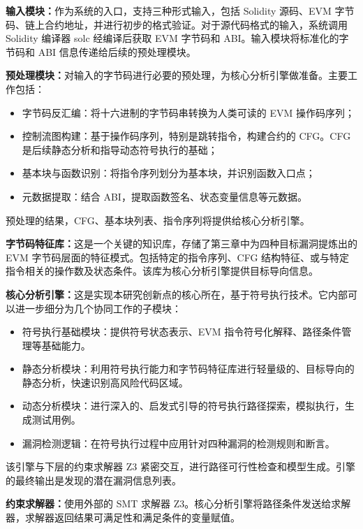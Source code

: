 \documentclass[print, master, vlined, timesmath]{DissertUESTC}
\begin{document}
\textbf{输入模块：}作为系统的入口，支持三种形式输入，包括 Solidity 源码、EVM 字节码、链上合约地址，并进行初步的格式验证。对于源代码格式的输入，系统调用 Solidity 编译器 solc 经编译后获取 EVM 字节码和 ABI。输入模块将标准化的字节码和 ABI 信息传递给后续的预处理模块。

\textbf{预处理模块：}对输入的字节码进行必要的预处理，为核心分析引擎做准备。主要工作包括： 

\begin{itemize}
    \item 字节码反汇编：将十六进制的字节码串转换为人类可读的 EVM 操作码序列；
    \item 控制流图构建：基于操作码序列，特别是跳转指令，构建合约的 CFG。CFG 是后续静态分析和指导动态符号执行的基础；
    \item 基本块与函数识别：将指令序列划分为基本块，并识别函数入口点；
    \item 元数据提取：结合 ABI，提取函数签名、状态变量信息等元数据。
\end{itemize}
预处理的结果，CFG、基本块列表、指令序列将提供给核心分析引擎。

\textbf{字节码特征库：}这是一个关键的知识库，存储了第三章中为四种目标漏洞提炼出的 EVM 字节码层面的特征模式。包括特定的指令序列、CFG 结构特征、或与特定指令相关的操作数及状态条件。该库为核心分析引擎提供目标导向信息。

\textbf{核心分析引擎：}这是实现本研究创新点的核心所在，基于符号执行技术。它内部可以进一步细分为几个协同工作的子模块：

\begin{itemize}
    \item 符号执行基础模块：提供符号状态表示、EVM 指令符号化解释、路径条件管理等基础能力。
    \item 静态分析模块：利用符号执行能力和字节码特征库进行轻量级的、目标导向的静态分析，快速识别高风险代码区域。
    \item 动态分析模块：进行深入的、启发式引导的符号执行路径探索，模拟执行，生成测试用例。
    \item 漏洞检测逻辑：在符号执行过程中应用针对四种漏洞的检测规则和断言。
\end{itemize}


该引擎与下层的约束求解器 Z3 紧密交互，进行路径可行性检查和模型生成。引擎的最终输出是发现的潜在漏洞信息列表。

\textbf{约束求解器：}使用外部的 SMT 求解器 Z3。核心分析引擎将路径条件发送给求解器，求解器返回结果可满足性和满足条件的变量赋值。
\end{document}
